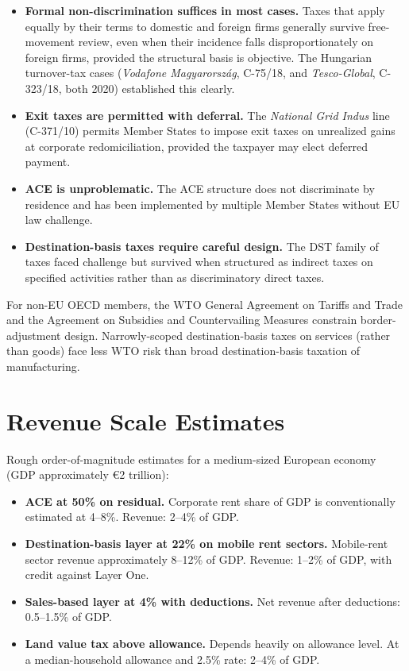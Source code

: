 \documentclass[11pt,a4paper]{article}
\begin{document}
\begin{itemize}
\item \textbf{Formal non-discrimination suffices in most cases.} Taxes that apply equally by their terms to domestic and foreign firms generally survive free-movement review, even when their incidence falls disproportionately on foreign firms, provided the structural basis is objective. The Hungarian turnover-tax cases (\emph{Vodafone Magyarorsz\'{a}g}, C-75/18, and \emph{Tesco-Global}, C-323/18, both 2020) established this clearly.

\item \textbf{Exit taxes are permitted with deferral.} The \emph{National Grid Indus} line (C-371/10) permits Member States to impose exit taxes on unrealized gains at corporate redomiciliation, provided the taxpayer may elect deferred payment.

\item \textbf{ACE is unproblematic.} The ACE structure does not discriminate by residence and has been implemented by multiple Member States without EU law challenge.

\item \textbf{Destination-basis taxes require careful design.} The DST family of taxes faced challenge but survived when structured as indirect taxes on specified activities rather than as discriminatory direct taxes.
\end{itemize}

For non-EU OECD members, the WTO General Agreement on Tariffs and Trade and the Agreement on Subsidies and Countervailing Measures constrain border-adjustment design. Narrowly-scoped destination-basis taxes on services (rather than goods) face less WTO risk than broad destination-basis taxation of manufacturing.

\section{Revenue Scale Estimates}

Rough order-of-magnitude estimates for a medium-sized European economy (GDP approximately €2 trillion):

\begin{itemize}
\item \textbf{ACE at 50\% on residual.} Corporate rent share of GDP is conventionally estimated at 4--8\%. Revenue: 2--4\% of GDP.
\item \textbf{Destination-basis layer at 22\% on mobile rent sectors.} Mobile-rent sector revenue approximately 8--12\% of GDP. Revenue: 1--2\% of GDP, with credit against Layer One.
\item \textbf{Sales-based layer at 4\% with deductions.} Net revenue after deductions: 0.5--1.5\% of GDP.
\item \textbf{Land value tax above allowance.} Depends heavily on allowance level. At a median-household allowance and 2.5\% rate: 2--4\% of GDP.
\end{itemize}
\end{document}
